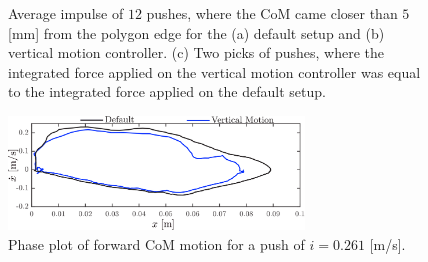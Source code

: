 \begin{figure}[h]
\begin{subfigure}{0.32\textwidth}
  \caption{}
   \label{fig:imp3}
  \end{subfigure}
  \caption{Average impulse of $12$ pushes, where the \ac{CoM} came closer than $5$ [mm] from the polygon edge for the (a) default setup and (b) vertical motion controller. (c) Two picks of pushes, where the integrated force applied on the vertical motion controller was equal to the integrated force applied on the default setup. }
  \label{fig:impulsecompare}
\end{figure}

\begin{figure}[h]
\centering
\includegraphics[width=0.7\textwidth]{STYLESTUFF/valcomparephaseHW.png}
\caption{Phase plot of forward \ac{CoM} motion for a push of $i=0.261$ [m/s].}
\label{fig:valcomparephaseHW}
\end{figure}
